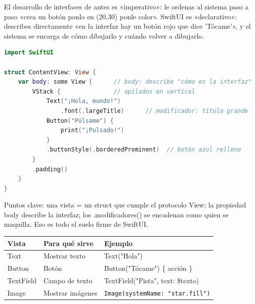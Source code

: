 


El desarrollo de interfaces de antes es «imperativo»: le ordenas al sistema paso a paso «crea un botón ponlo en (20,30) ponle color». SwiftUI es «declarativo»: describes directamente «en la interfaz hay un botón rojo que dice 'Tócame'», y el sistema se encarga de cómo dibujarlo y cuándo volver a dibujarlo.

\begin{lstlisting}[language=Swift]
import SwiftUI

struct ContentView: View {
    var body: some View {      // body: describe "cómo es la interfaz"
        VStack {               // apilados en vertical
            Text("¡Hola, mundo!")
                .font(.largeTitle)      // modificador: título grande
            Button("Púlsame") {
                print("¡Pulsado!")
            }
            .buttonStyle(.borderedProminent)  // botón azul relleno
        }
        .padding()
    }
}
\end{lstlisting}

Puntos clave: una vista = un struct que cumple el protocolo View; la propiedad body describe la interfaz; los .modificadores() se encadenan como quien se maquilla. Eso es todo el suelo firme de SwiftUI.


\begin{center}
\begin{tabularx}{\linewidth}{|X|X|X|}
\hline
\textbf{Vista} & \textbf{Para qué sirve} & \textbf{Ejemplo} \tabularnewline
\hline
Text & Mostrar texto & Text("Hola") \tabularnewline
Button & Botón & Button("Tócame") \{ acción \} \tabularnewline
TextField & Campo de texto & TextField("Pista", text: \$texto) \tabularnewline
Image & Mostrar imágenes & \texttt{Image(systemName: "star.\allowbreak fill")} \tabularnewline
\hline
\end{tabularx}
\end{center}

